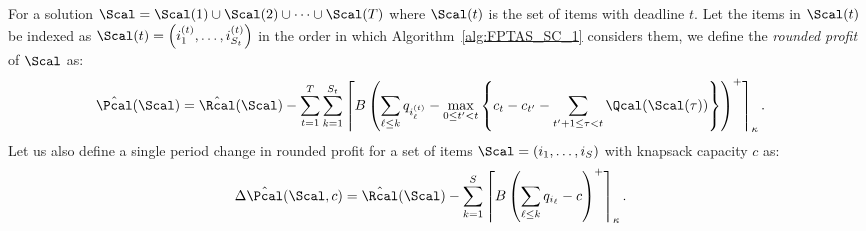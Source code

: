 For a solution $\Scal =  \Scal(1) \cup \Scal(2) \cup \cdots \cup \Scal(T)$ where $\Scal(t)$ is the set of items with deadline $t$. Let the items in $\Scal(t)$ be indexed as $\Scal(t) = \left(i^{(t)}_1, \ldots, i^{(t)}_{S_t}\right)$ in the order in which Algorithm~\ref{alg:FPTAS_SC_1} considers them, we define the {\it rounded profit} of $\Scal$ as:
\begin{align} \label{Phat}
\hat{\Pcal}(\Scal) &= \hat{\Rcal}(\Scal) -
\sum_{t=1}^T  \sum_{k=1}^{S_t} \left \lceil B  \left( \sum_{\ell \leq k} q_{i^{(t)}_{\ell}} - \max_{0 \leq t' < t}\left\{ c_t - c_{t'} - \sum_{t'+1 \leq \tau <  t} \Qcal(\Scal(\tau)) \right\} \right)^+ \right \rceil_{\kappa} .
\end{align}
Let us also define a single period change in rounded profit for a set of items $\Scal = (i_1, \ldots, i_S)$ with knapsack capacity $c$ as:
\begin{align} \label{Phatc}
\Delta \hat{\Pcal}(\Scal,c) &= \hat{\Rcal}(\Scal) -
\sum_{k=1}^{S} \left \lceil B  \left( \sum_{\ell \leq k} q_{i_{\ell}} - c  \right)^+ \right \rceil_{\kappa} .
\end{align}


